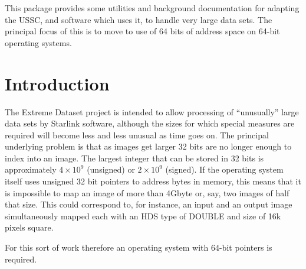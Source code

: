 \documentclass[twoside,11pt]{article}
\newcommand{\stardocinitials}  {SSN}
\newcommand{\stardocnumber}    {73.1}
\newcommand{\stardocabstract}  {
This package provides some utilities and background documentation 
for adapting the USSC, and software which uses it, 
to handle very large data sets.
The principal focus of this is to move to use of 64 bits of address
space on 64-bit operating systems.
}
\newcommand{\stardocname}{\stardocinitials /\stardocnumber}
\newenvironment{latexonly}{}{}
\renewcommand{\_}{\texttt{\symbol{95}}}
\renewcommand{\thepage}{\roman{page}}
\begin{document}
\stardocabstract
  \newpage
  \begin{latexonly}
    \setlength{\parskip}{0mm}
    \tableofcontents
    \setlength{\parskip}{\medskipamount}
    \markboth{\stardocname}{\stardocname}
  \end{latexonly}
\cleardoublepage
\renewcommand{\thepage}{\arabic{page}}
\setcounter{page}{1}



\newcommand{\xroutine}[1]{{\tt #1}}
\newcommand{\cc}[1]{{\tt #1}}
\newenvironment{squote}{\begin{quote}\begin{small}}{\end{small}\end{quote}}

\section{Introduction}

The Extreme Dataset project is intended to allow processing of ``unusually''
large data sets by Starlink software, 
although the sizes for which special measures
are required will become less and less unusual as time goes on.
The principal underlying problem is that as images get larger
32 bits are no longer enough to index into an image.
The largest integer that can be stored in 32 bits 
is approximately $4 \times 10^9$ (unsigned) or $2 \times 10^9$ (signed).
If the operating system itself uses unsigned 32 bit pointers to 
address bytes
in memory, this means that it is impossible to map an image of more
than 4Gbyte or, say, two images of half that size. 
This could correspond to, for instance, an input and an output image
simultaneously mapped each with an HDS type of \_DOUBLE and 
size of 16k pixels square.

For this sort of work therefore an operating system with 64-bit 
pointers is required.
\end{document}
